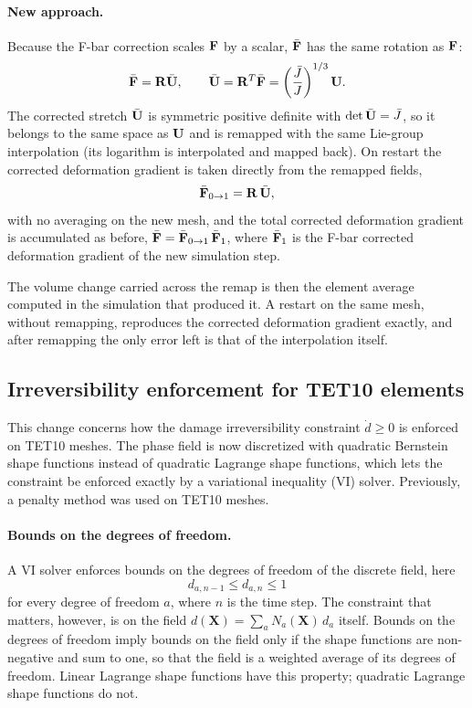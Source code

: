 \paragraph{New approach.}
Because the F-bar correction scales $\mathbf{F}$ by a scalar, $\bar{\mathbf{F}}$ has the same rotation as $\mathbf{F}$:
\begin{equation}
    \bar{\mathbf{F}} = \mathbf{R}\bar{\mathbf{U}},\qquad \bar{\mathbf{U}} = \mathbf{R}^T\bar{\mathbf{F}} = \left(\frac{\bar{J}}{J}\right)^{1/3}\mathbf{U}.
\end{equation}
The corrected stretch $\bar{\mathbf{U}}$ is symmetric positive definite with $\det\bar{\mathbf{U}}=\bar{J}$, so it belongs to the same space as $\mathbf{U}$ and is remapped with the same Lie-group interpolation (its logarithm is interpolated and mapped back). On restart the corrected deformation gradient is taken directly from the remapped fields,
\begin{equation}
    \bar{\mathbf{F}}_{0\rightarrow1} = \mathbf{R}\,\bar{\mathbf{U}},
\end{equation}
with no averaging on the new mesh, and the total corrected deformation gradient is accumulated as before, $\bar{\mathbf{F}} = \bar{\mathbf{F}}_{0\rightarrow1}\,\bar{\mathbf{F}}_1$, where $\bar{\mathbf{F}}_1$ is the F-bar corrected deformation gradient of the new simulation step.

The volume change carried across the remap is then the element average computed in the simulation that produced it. A restart on the same mesh, without remapping, reproduces the corrected deformation gradient exactly, and after remapping the only error left is that of the interpolation itself.

\subsection{Irreversibility enforcement for TET10 elements}\label{ss:bernstein}

This change concerns how the damage irreversibility constraint $\dot{d}\geq0$ is enforced on TET10 meshes. The phase field is now discretized with quadratic Bernstein shape functions instead of quadratic Lagrange shape functions, which lets the constraint be enforced exactly by a variational inequality (VI) solver. Previously, a penalty method was used on TET10 meshes.

\paragraph{Bounds on the degrees of freedom.}
A VI solver enforces bounds on the degrees of freedom of the discrete field, here
\begin{equation}
    d_{a,n-1} \leq d_{a,n} \leq 1
\end{equation}
for every degree of freedom $a$, where $n$ is the time step. The constraint that matters, however, is on the field $d(\mathbf{X}) = \sum_a N_a(\mathbf{X})\,d_a$ itself. Bounds on the degrees of freedom imply bounds on the field only if the shape functions are non-negative and sum to one, so that the field is a weighted average of its degrees of freedom. Linear Lagrange shape functions have this property; quadratic Lagrange shape functions do not.

